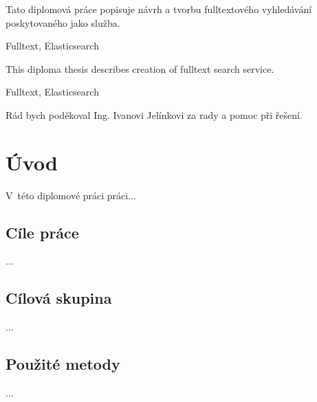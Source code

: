 \documentclass[FM,DP]{tulthesis}
\begin{document}


\begin{abstractCZ}
Tato diplomová práce popisuje návrh a tvorbu fulltextového vyhledávání poskytovaného jako služba.
\end{abstractCZ}

\begin{klicovaslovaCZ}
Fulltext, Elasticsearch
\end{klicovaslovaCZ}

\vspace{2cm}

\begin{abstractEN}
This diploma thesis describes creation of fulltext search service.
\end{abstractEN}

\begin{klicovaslovaEN}
Fulltext, Elasticsearch
\end{klicovaslovaEN}


\begin{acknowledgement}
Rád bych poděkoval Ing. Ivanovi Jelínkovi za rady a pomoc při řešení.
\end{acknowledgement}


\tableofcontents
\clearpage




\chapter{Úvod}

V~této diplomové práci práci...

\section{Cíle práce}
...

\section{Cílová skupina}
...

\section{Použité metody}
...
\end{document}
